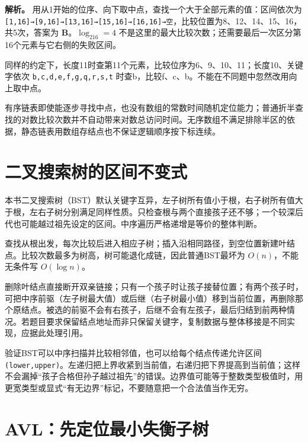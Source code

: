 \textbf{解析。} 用从1开始的位序、向下取中点，查找一个大于全部元素的值：区间依次为 \allowbreak{}\texttt{{[}1,}\allowbreak{}\texttt{16{]}→{[}9,}\allowbreak{}\texttt{16{]}→{[}13,}\allowbreak{}\texttt{16{]}→{[}15,}\allowbreak{}\texttt{16{]}→{[}16,}\allowbreak{}\texttt{16{]}→空}，比较位置为8、12、14、15、16，共5次，答案为 \textbf{B}。\(\log_216=4\) 不是这里的最大比较次数；还需要最后一次区分第16个元素与它右侧的失败区间。

同样的约定下，长度11时查第11个元素，比较位序为6、9、10、11；长度10、关键字依次 \allowbreak{}\texttt{b,}\allowbreak{}\texttt{c,}\allowbreak{}\texttt{d,}\allowbreak{}\texttt{e,}\allowbreak{}\texttt{f,}\allowbreak{}\texttt{g,}\allowbreak{}\texttt{q,}\allowbreak{}\texttt{r,}\allowbreak{}\texttt{s,}\allowbreak{}\texttt{t} 时查b，比较f、c、b。不能在不同题中忽然改用向上取中点。

有序链表即使能逐步寻找中点，也没有数组的常数时间随机定位能力；普通折半查找的对数比较次数并不自动带来对数总访问时间。无序数组不满足排除半区的依据，静态链表用数组存结点也不保证逻辑顺序按下标连续。

\section{二叉搜索树的区间不变式}\label{ds-07-04}

本书二叉搜索树（BST）默认关键字互异，左子树所有值小于根，右子树所有值大于根，左右子树分别满足同样性质。只检查根与两个直接孩子还不够；一个较深后代也可能越过祖先设定的区间。中序遍历严格递增是等价的整体判断。

查找从根出发，每次比较后进入相应子树；插入沿相同路径，到空位置新建叶结点。比较次数最多为树高，树可能退化成链，因此普通BST最坏为 \(O(n)\)，不能无条件写 \(O(\log n)\)。

删除叶结点直接断开双亲链接；只有一个孩子时让孩子接替位置；有两个孩子时，可把中序前驱（左子树最大值）或后继（右子树最小值）移到当前位置，再删除那个原结点。被选的前驱不会有右孩子，后继不会有左孩子，最后归结到前两种情况。若题目要求保留结点地址而非只保留关键字，复制数据与整体移接是不同实现，应据此处理引用。

验证BST可以中序扫描并比较相邻值，也可以给每个结点传递允许区间 \allowbreak{}\texttt{(lower,}\allowbreak{}\texttt{upper)}。左递归把上界收紧到当前值，右递归把下界提高到当前值；这样不会漏掉``孩子合格但孙子越过祖先''的错误。边界值可能等于整数类型极值时，用更宽类型或显式``有无边界''标记，不要随意把一个合法值当作无穷。

\section{AVL：先定位最小失衡子树}\label{ds-07-05}

